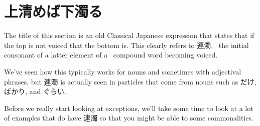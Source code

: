 \section{上清めば下濁る}
 
\par{ The title of this section is an old Classical Japanese expression that states that if the top is not voiced that the bottom is. This clearly refers to 連濁,  the initial consonant of a latter element of a  compound word becoming voiced. }

\par{ We've seen how this typically works for nouns and sometimes with adjectival phrases, but 連濁 is actually seen in particles that come from nouns such as だけ, ばかり, and ぐらい. }

\par{ Before we really start looking at exceptions, we'll take some time to look at a lot of examples that do have 連濁 so that you might be able to some commonalities. }

